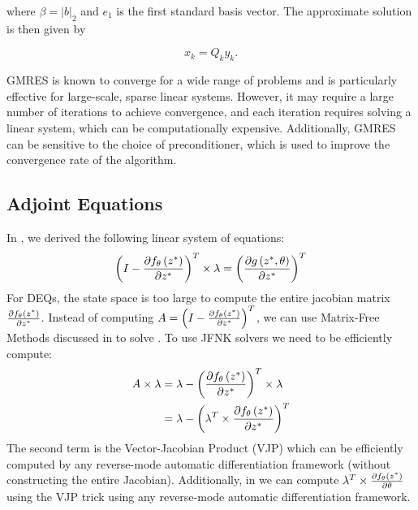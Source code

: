 where $\beta = |b|_2$ and $e_1$ is the first standard basis vector. The approximate solution is then given by

\begin{equation}
  x_k = Q_k y_k.
\end{equation}

GMRES is known to converge for a wide range of problems and is particularly effective for large-scale, sparse linear systems. However, it may require a large number of iterations to achieve convergence, and each iteration requires solving a linear system, which can be computationally expensive. Additionally, GMRES can be sensitive to the choice of preconditioner, which is used to improve the convergence rate of the algorithm.


\subsection{Adjoint Equations}
\label{subsec:adjoint_equations_deqs}

In , we derived the following linear system of equations:
%
\begin{equation}
  \left( I - \frac{\partial f_\theta\left(z^*\right)}{\partial z^*} \right)^T \times \lambda = \left(\frac{\partial g\left(z^*, \theta\right)}{\partial z^*}\right)^T
\end{equation}
%
For DEQs, the state space is too large to compute the entire jacobian matrix $\frac{\partial f_\theta\left(z^*\right)}{\partial z^*}$. Instead of computing $ A = \left( I - \frac{\partial f_\theta\left(z^*\right)}{\partial z^*} \right)^T $, we can use Matrix-Free Methods discussed in  to solve . To use JFNK solvers we need to be efficiently compute:
%
\begin{align}
  A \times \lambda & = \lambda - \left( \frac{\partial f_\theta\left(z^*\right)}{\partial z^*} \right)^T  \times \lambda   \\
                   & = \lambda - \left( \lambda^T \times  \frac{\partial f_\theta\left(z^*\right)}{\partial z^*} \right)^T
\end{align}
%
The second term is the Vector-Jacobian Product (VJP) which can be efficiently computed by any reverse-mode automatic differentiation framework (without constructing the entire Jacobian). Additionally, in  we can compute $\lambda^T \times \frac{\partial f_\theta\left(z^*\right)}{\partial \theta}$ using the VJP trick using any reverse-mode automatic differentiation framework.

